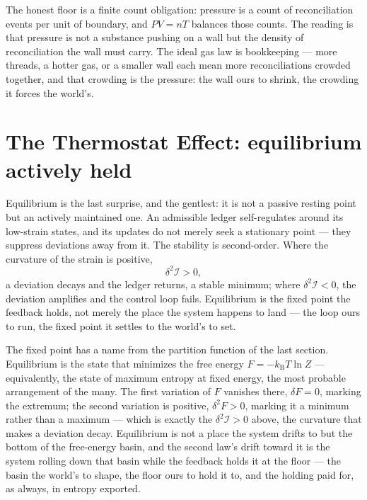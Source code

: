 The honest floor is a finite count obligation: pressure is a count of reconciliation events per unit of
boundary, and $PV = nT$ balances those counts. The reading is that pressure is not a substance pushing on a
wall but the density of reconciliation the wall must carry. The ideal gas law is bookkeeping --- more threads,
a hotter gas, or a smaller wall each mean more reconciliations crowded together, and that crowding is the
pressure: the wall ours to shrink, the crowding it forces the world's.

\section{The Thermostat Effect: equilibrium actively held}
\label{se:thermostat}

Equilibrium is the last surprise, and the gentlest: it is not a passive resting point but an actively
maintained one. An admissible ledger self-regulates around its low-strain states, and its updates do not
merely seek a stationary point --- they suppress deviations away from it. The stability is second-order. Where
the curvature of the strain is positive,
\begin{equation}
  \delta^2 \mathcal{I} > 0,
\end{equation}
a deviation decays and the ledger returns, a stable minimum; where $\delta^2 \mathcal{I} < 0$, the deviation
amplifies and the control loop fails. Equilibrium is the fixed point the feedback holds, not merely the place
the system happens to land --- the loop ours to run, the fixed point it settles to the world's to set.

The fixed point has a name from the partition function of the last section. Equilibrium is the state that
minimizes the free energy $F = -k_{\mathrm{B}} T \ln Z$ --- equivalently, the state of maximum entropy at fixed
energy, the most probable arrangement of the many. The first variation of $F$ vanishes there, $\delta F = 0$,
marking the extremum; the second variation is positive, $\delta^2 F > 0$, marking it a minimum rather than a
maximum --- which is exactly the $\delta^2 \mathcal{I} > 0$ above, the curvature that makes a deviation decay.
Equilibrium is not a place the system drifts to but the bottom of the free-energy basin, and the second law's
drift toward it is the system rolling down that basin while the feedback holds it at the floor --- the basin
the world's to shape, the floor ours to hold it to, and the holding paid for, as always, in entropy exported.

